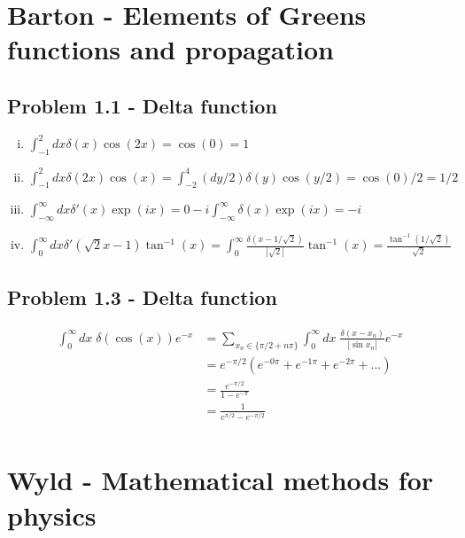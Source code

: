 \documentclass[../main.tex]{subfiles}
\begin{document}
\section{{\sc Barton} - Elements of Greens functions and propagation}
\subsection{Problem 1.1 - Delta function}
\begin{enumerate}[(i)]
\item $\int_{-1}^2dx\delta(x)\cos(2x)=\cos(0)=1$
\item $\int_{-1}^2dx\delta(2x)\cos(x)=\int_{-2}^4(dy/2)\delta(y)\cos(y/2)=\cos(0)/2=1/2$
\item $\int_{-\infty}^\infty dx \delta'(x)\exp(ix)=0-i\int_{-\infty}^\infty \delta(x)\exp(ix)=-i$
\item $\int_0^\infty dx \delta'(\sqrt{2}x-1)\tan^{-1}(x)=\int_0^\infty\frac{\delta(x-1/\sqrt{2})}{|\sqrt{2}|}\tan^{-1}(x)=\frac{\tan^{-1}(1/\sqrt{2})}{\sqrt{2}}$
\end{enumerate}

\subsection{Problem 1.3 - Delta function}
\begin{align}
\int_0^\infty dx\;\delta(\cos(x))e^{-x}
&=\sum_{x_n\in\{\pi/2+n\pi\}}\int_0^\infty dx\;\frac{\delta(x-x_n)}{|\sin x_n|}e^{-x}\\
&=e^{-\pi/2}\left(e^{-0\pi}+e^{-1\pi}+e^{-2\pi}+...\right)\\
&=\frac{e^{-\pi/2}}{1-e^{-\pi}}\\
&=\frac{1}{e^{\pi/2}-e^{-\pi/2}}\\
\end{align}

\section{{\sc Wyld} - Mathematical methods for physics}
\end{document}

